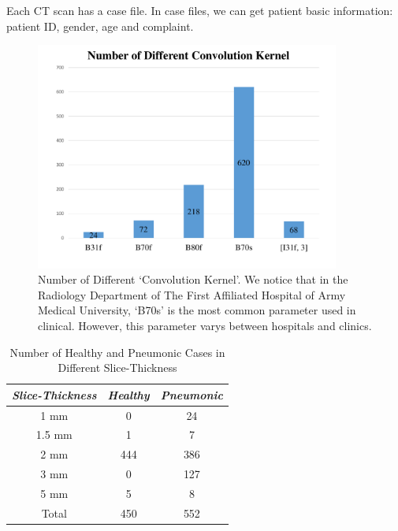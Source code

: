 \documentclass[journal]{IEEEtran}
\begin{document}
Each CT scan has a case file. In case files, we can get patient basic information: patient ID, gender, age and complaint. 

\begin{figure}[t]
\centerline{\includegraphics[width=100mm]{NumberofDifferentConvolutionKernel.pdf}}
\vspace{-0cm}
\caption{Number of Different `Convolution Kernel'. We notice that in the Radiology Department of The First Affiliated Hospital of Army Medical University, `B70s' is the most common parameter used in clinical. However, this parameter varys between hospitals and clinics.}
\vspace{-0cm}
\label{NumberofDifferentConvolutionKernel}
\end{figure}


\begin{table}[htb]
\vspace{-0cm}
\caption{Number of Healthy and Pneumonic Cases in Different Slice-Thickness}
\vspace{-0cm}
\begin{center}
\begin{tabular}{|c|c|c|}
\hline
\textbf{\textit{Slice-Thickness}}& \textbf{\textit{Healthy}}& \textbf{\textit{Pneumonic}}  \\
\hline
1 mm & 0 & 24 \\
1.5 mm  & 1 & 7\\
2 mm & 444 & 386  \\
3 mm & 0 & 127  \\
5 mm & 5 & 8  \\
\hline
Total & 450 & 552 \\
\hline
\end{tabular}
\vspace{-0cm}
\label{distributionofhealthyandpneumonic}
\end{center}
\vspace{-0cm}
\end{table}
\end{document}
